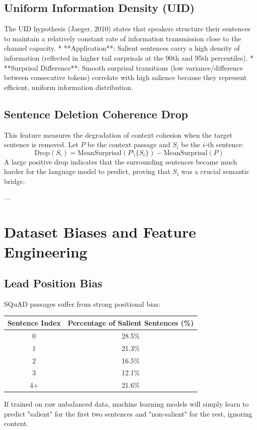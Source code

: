 \documentclass[11pt,a4paper]{article}
\begin{document}
\subsection{Uniform Information Density (UID)}
The UID hypothesis (Jaeger, 2010) states that speakers structure their sentences to maintain a relatively constant rate of information transmission close to the channel capacity. 
* **Application**: Salient sentences carry a high density of information (reflected in higher tail surprisals at the 90th and 95th percentiles).
* **Surprisal Difference**: Smooth surprisal transitions (low variance/difference between consecutive tokens) correlate with high salience because they represent efficient, uniform information distribution.

\subsection{Sentence Deletion Coherence Drop}
This feature measures the degradation of context cohesion when the target sentence is removed. Let $P$ be the context passage and $S_i$ be the $i$-th sentence:
\[
\text{Drop}(S_i) = \text{MeanSurprisal}(P \setminus \{S_i\}) - \text{MeanSurprisal}(P)
\]
A large positive drop indicates that the surrounding sentences became much harder for the language model to predict, proving that $S_i$ was a crucial semantic bridge.

---

\section{Dataset Biases and Feature Engineering}

\subsection{Lead Position Bias}
SQuAD passages suffer from strong positional bias:
\begin{table}[h]
    \centering
    \begin{tabular}{cc}
        \toprule
        \textbf{Sentence Index} & \textbf{Percentage of Salient Sentences (\%)} \\
        \midrule
        0 & 28.5\% \\
        1 & 21.3\% \\
        2 & 16.5\% \\
        3 & 12.1\% \\
        4+ & 21.6\% \\
        \bottomrule
    \end{tabular}
\end{table}
If trained on raw unbalanced data, machine learning models will simply learn to predict "salient" for the first two sentences and "non-salient" for the rest, ignoring content.
\end{document}
